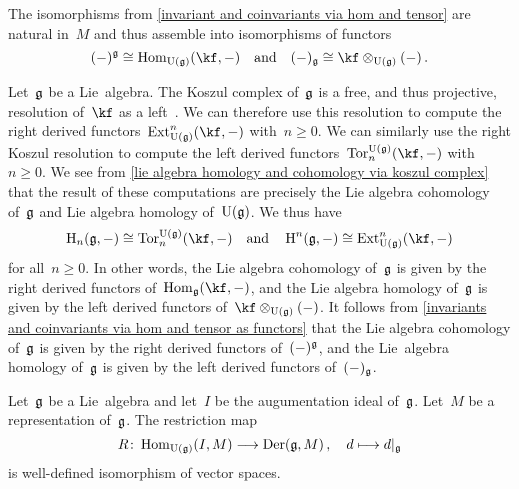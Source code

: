 \begin{remark}
	\label{invariants and coinvariants via hom and tensor as functors}
	The isomorphisms from \cref{invariant and coinvariants via hom and tensor} are natural in~$M$ and thus assemble into isomorphisms of functors
	\[
		(\ph)^{\glie}
		\cong
		\Hom_{\Univ(\glie)}( \kf, - )
		\quad\text{and}\quad
		(\ph)_{\glie}
		\cong
		\kf \otimes_{\Univ(\glie)} (\ph) \,.
	\]
\end{remark}


\begin{fluff}
	Let~$\mathfrak{g}$ be a Lie~algebra.
	The Koszul complex of~$\mathfrak{g}$ is a free, and thus projective, resolution of~$\kf$ as a left~\module{$\Univ(\glie)$}.
	We can therefore use this resolution to compute the right derived functors~$\Ext_{\Univ(\glie)}^n(\kf, \ph)$ with~$n \geq 0$.
	We can similarly use the right Koszul resolution to compute the left derived functors~$\cramped{\Tor^{\Univ(\glie)}_n(\kf, \ph)}$ with~$n \geq 0$.
	We see from \cref{lie algebra homology and cohomology via koszul complex} that the result of these computations are precisely the Lie algebra cohomology of~$\mathfrak{g}$ and Lie algebra homology of~$\Univ(\glie)$.
	We thus have
	\[
		\Homology_n(\glie, \ph)
		\cong
		\Tor^{\Univ(\glie)}_n(\kf, \ph)
		\quad\text{and}\quad
		\Homology^n(\glie, \ph)
		\cong
		\Ext^n_{\Univ(\glie)}(\kf, \ph)
	\]
	for all~$n \geq 0$.
	In other words, the Lie algebra cohomology of~$\mathfrak{g}$ is given by the right derived functors of~$\Hom_{\glie}(\kf, \ph)$, and the Lie algebra homology of~$\mathfrak{g}$ is given by the left derived functors of~$\kf \otimes_{\Univ(\glie)} (\ph)$.
	It follows from \cref{invariants and coinvariants via hom and tensor as functors} that the Lie algebra cohomology of~$\mathfrak{g}$ is given by the right derived functors of~$(-)^{\mathfrak{g}}$, and the Lie~algebra homology of~$\mathfrak{g}$ is given by the left derived functors of~$(-)_{\mathfrak{g}}$.
\end{fluff}


\begin{proposition}
	Let~$\mathfrak{g}$ be a Lie~algebra and let~$I$ be the augumentation ideal of~$\mathfrak{g}$.
	Let~$M$ be a representation of~$\mathfrak{g}$.
	The restriction map
	\[
		R
		\colon
		\Hom_{\Univ(\glie)}(I, M)
		\to
		\Der(\glie, M) \,,
		\index{derivation!of a representation}
		\quad
		d
		\mapsto
		\restrict{d}{\glie}
	\]
	is well-defined isomorphism of vector spaces.
\end{proposition}



